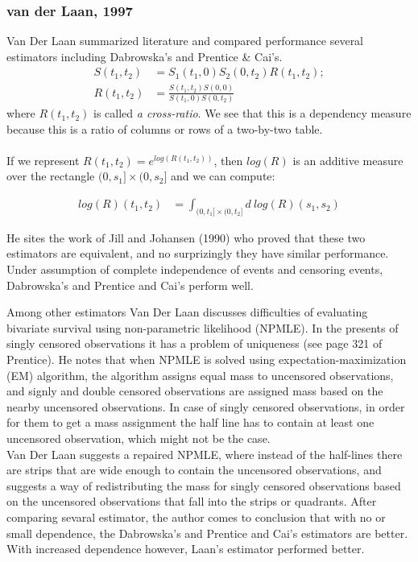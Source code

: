\documentclass[]{article}
\begin{document}
\subsubsection{van der Laan, 1997 \cite{van1997nonparametric}}
Van Der Laan summarized literature and compared performance several estimators including Dabrowska's and Prentice \& Cai's.
	$$
	\begin{aligned}
    S(t_1, t_2) &= S_1(t_1, 0)S_2(0, t_2)R(t_1, t_2);\\
		R(t_1, t_2) &= \frac{S(t_1, t_2)S(0, 0)}{S(t_1,0)S(0,t_2)}
 	\end{aligned}
	$$
where $R(t_1, t_2)$ is called \emph{a cross-ratio}. We see that this is a dependency measure because this is a ratio of columns or rows of a two-by-two table.\\
\\
If we represent $R(t_1, t_2) = e^{log(R(t_1, t_2))}$, then $log(R)$ is  an additive measure over the rectangle $(0,s_1]\times(0,s_2]$ and we can compute:
	
	$$
	\begin{aligned}
		log(R)(t_1, t_2) &= \int_{(0,t_1]\times(0,t_2]} d~log(R)(s_1,s_2)
 	\end{aligned}
	$$

He sites the work of Jill and Johansen (1990) who proved that these two estimators are equivalent, and no surprizingly they have similar performance. Under assumption of complete independence of events and censoring events, Dabrowska's and Prentice and Cai's perform well.

Among other estimators Van Der Laan discusses difficulties of evaluating bivariate survival using non-parametric likelihood (NPMLE). In the presents of singly censored observations it has a problem of uniqueness (see page 321 of Prentice). He notes that when NPMLE is solved using expectation-maximization (EM) algorithm, the algorithm assigns equal mass to uncensored observations, and signly and double censored observations are assigned mass based on the nearby uncensored observations. In case of singly censored observations, in order for them to get a mass assignment the half line has to contain at least one uncensored observation, which might not be the case.\\
Van Der Laan suggests a repaired NPMLE, where instead of the half-lines there are strips that are wide enough to contain the uncensored observations, and suggests a way of redistributing the mass for singly censored observations based on the uncensored observations that fall into the strips or quadrants.
After comparing sevaral estimator, the author comes to conclusion that with no or small dependence, the Dabrowska's and Prentice and Cai's estimators are better. With increased dependence however, Laan's estimator performed better.
\end{document}
